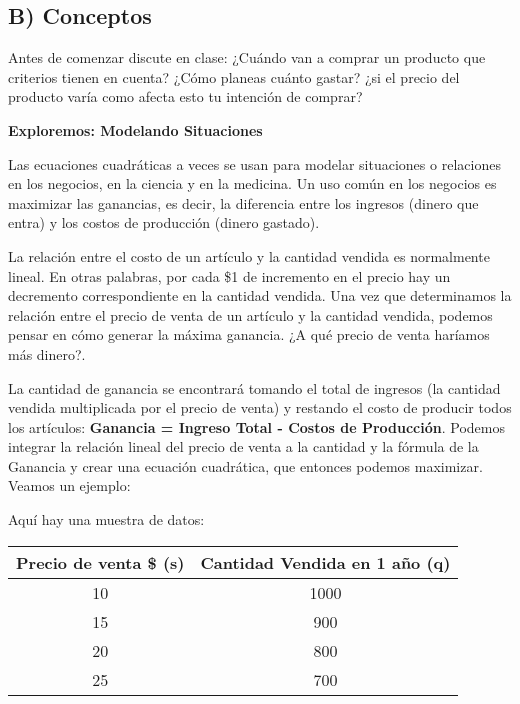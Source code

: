 \documentclass[12pt,a4paper]{article}
\begin{document}
\vspace{5mm}


\subsection*{B) Conceptos}

Antes de comenzar discute en clase: ¿Cuándo van a comprar un producto que criterios tienen en cuenta? ¿Cómo planeas cuánto gastar? ¿si el precio del producto varía como afecta esto tu intención de comprar?

\textbf{Exploremos: Modelando Situaciones}

Las ecuaciones cuadráticas a veces se usan para modelar situaciones o relaciones en los negocios, en la ciencia y en la medicina. Un uso común en los negocios es maximizar las ganancias, es decir, la diferencia entre los ingresos (dinero que entra) y los costos de producción (dinero gastado).

La relación entre el costo de un artículo y la cantidad vendida es normalmente lineal. En otras palabras, por cada \$1 de incremento en el precio hay un decremento correspondiente en la cantidad vendida. Una vez que determinamos la relación entre el precio de venta de un artículo y la cantidad vendida, podemos pensar en cómo generar la máxima ganancia. ¿A qué precio de venta haríamos más dinero?.

La cantidad de ganancia se encontrará tomando el total de ingresos (la cantidad vendida multiplicada por el precio de venta) y restando el costo de producir todos los artículos: \textbf{Ganancia = Ingreso Total - Costos de Producción}. Podemos integrar la relación lineal del precio de venta a la cantidad y la fórmula de la Ganancia y crear una ecuación cuadrática, que entonces podemos maximizar. Veamos un ejemplo:

Aquí hay una muestra de datos:

\begin{center}
\begin{tabular}{|c|c|}
\hline
\textbf{Precio de venta \$ (s)} & \textbf{Cantidad Vendida en 1 año (q)} \\
\hline
10 & 1000 \\
15 & 900 \\
20 & 800 \\
25 & 700 \\
\hline
\end{tabular}
\end{center}
\end{document}
